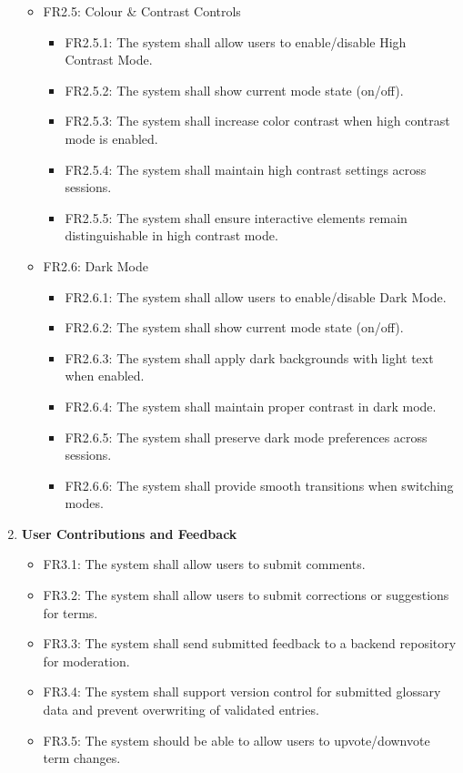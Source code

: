 \documentclass[12pt]{article}
\begin{document}
\begin{enumerate}[label=FR\arabic*:, leftmargin=2.5em]
\begin{itemize}
        \item FR2.5: Colour \& Contrast Controls
        \begin{itemize}
            \item FR2.5.1: The system shall allow users to enable/disable High Contrast Mode.
            \item FR2.5.2: The system shall show current mode state (on/off).
            \item FR2.5.3: The system shall increase color contrast when high contrast mode is enabled.
            \item FR2.5.4: The system shall maintain high contrast settings across sessions.
            \item FR2.5.5: The system shall ensure interactive elements remain distinguishable in high contrast mode.
        \end{itemize}
        
        \item FR2.6: Dark Mode
        \begin{itemize}
            \item FR2.6.1: The system shall allow users to enable/disable Dark Mode.
            \item FR2.6.2: The system shall show current mode state (on/off).
            \item FR2.6.3: The system shall apply dark backgrounds with light text when enabled.
            \item FR2.6.4: The system shall maintain proper contrast in dark mode.
            \item FR2.6.5: The system shall preserve dark mode preferences across sessions.
            \item FR2.6.6: The system shall provide smooth transitions when switching modes.
        \end{itemize}
    \end{itemize}

    \item \textbf{User Contributions and Feedback}
    \begin{itemize}
        \item FR3.1: The system shall allow users to submit comments.
        \item FR3.2: The system shall allow users to submit corrections or suggestions for terms.
        \item FR3.3: The system shall send submitted feedback to a backend repository for moderation.
        \item FR3.4: The system shall support version control for submitted glossary data and prevent overwriting of validated entries.
        \item FR3.5: The system should be able to allow users to upvote/downvote term changes.
    \end{itemize}


\end{enumerate}
\end{document}
